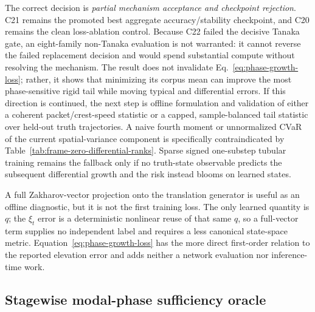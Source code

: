 \documentclass[11pt]{article}
\begin{document}
The correct decision is \emph{partial mechanism acceptance and checkpoint
rejection}.  C21 remains the promoted best aggregate accuracy/stability
checkpoint, and C20 remains the clean loss-ablation control.  Because C22
failed the decisive Tanaka gate, an eight-family non-Tanaka evaluation is not
warranted: it cannot reverse the failed replacement decision and would spend
substantial compute without resolving the mechanism.  The result does not
invalidate Eq.~\eqref{eq:phase-growth-loss}; rather, it shows that minimizing
its corpus mean can improve the most phase-sensitive rigid tail while moving
typical and differential errors.  If this direction is continued, the next
step is offline formulation and validation of either a coherent
packet/crest-speed statistic or a capped, sample-balanced tail statistic over
held-out truth trajectories.  A naive fourth moment or unnormalized CVaR of the
current spatial-variance component is specifically contraindicated by
Table~\ref{tab:frame-zero-differential-ranks}.  Sparse signed one-substep tubular
training remains the fallback only if no truth-state observable predicts the
subsequent differential growth and the risk instead blooms on learned states.

A full Zakharov-vector projection onto the translation generator is useful as
an offline diagnostic, but it is not the first training loss.  The only learned
quantity is \(q\); the \(\xi_t\) error is a deterministic nonlinear reuse of
that same \(q\), so a full-vector term supplies no independent label and
requires a less canonical state-space metric.  Equation~\eqref{eq:phase-growth-loss}
has the more direct first-order relation to the reported elevation error and
adds neither a network evaluation nor inference-time work.

\subsection{Stagewise modal-phase sufficiency oracle}
\label{sec:modal-phase-oracle}
\end{document}
